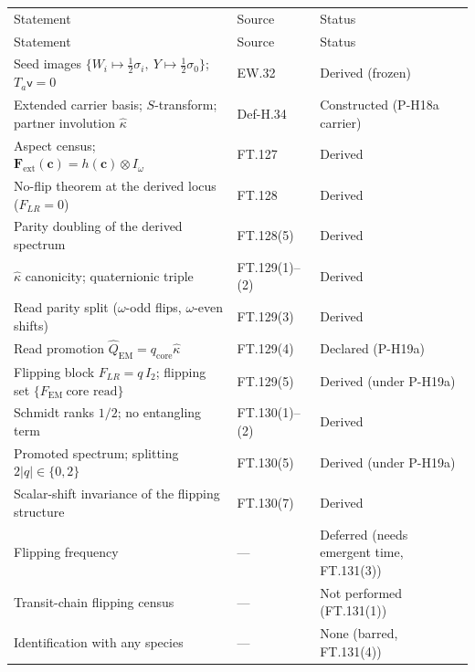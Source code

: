 \documentclass[11pt,openany]{report}
\theoremstyle{canonplain}
\theoremstyle{canondef}
\begin{document}
{\small\setlength{\tabcolsep}{4pt}
\begin{longtable}{>{\raggedright\arraybackslash}p{}|>{\raggedright\arraybackslash}p{}|>{\raggedright\arraybackslash}p{}}
\toprule
Statement & Source & Status \\
\addlinespace[2pt]
\midrule
\endfirsthead
\toprule
Statement & Source & Status \\
\addlinespace[2pt]
\midrule
\endhead
\bottomrule
\endlastfoot
Seed images $\{W_i\mapsto\tfrac12\sigma_i,\ Y\mapsto\tfrac12\sigma_0\}$; $T_a\mathsf v=\allowbreak 0$ & EW.32 & Derived (frozen) \\
Extended carrier basis; $S$-transform; partner involution $\hat\kappa$ & Def-H.34 & Constructed (P-H18a carrier) \\
Aspect census; $\mathbf F_{\mathrm{ext}}(\mathbf c)=\allowbreak h(\mathbf c)\otimes I_\omega$ & FT.127 & Derived \\
No-flip theorem at the derived locus ($F_{LR}=\allowbreak 0$) & FT.128 & Derived \\
Parity doubling of the derived spectrum & FT.128(5) & Derived \\
$\hat\kappa$ canonicity; quaternionic triple & FT.129(1)–(2) & Derived \\
Read parity split ($\omega$-odd flips, $\omega$-even shifts) & FT.129(3) & Derived \\
Read promotion $\hat Q_{\mathrm{EM}}=\allowbreak q_{\mathrm{core}}\hat\kappa$ & FT.129(4) & Declared (P-H19a) \\
Flipping block $F_{LR}=\allowbreak q\,\allowbreak I_2$; flipping set $\{F_{\mathrm{EM}}\ \text{core read}\}$ & FT.129(5) & Derived (under P-H19a) \\
Schmidt ranks $1/2$; no entangling term & FT.130(1)–(2) & Derived \\
Promoted spectrum; splitting $2|q|\in\allowbreak \{0,2\}$ & FT.130(5) & Derived (under P-H19a) \\
Scalar-shift invariance of the flipping structure & FT.130(7) & Derived \\
Flipping frequency & — & Deferred (needs emergent time, FT.131(3)) \\
Transit-chain flipping census & — & Not performed (FT.131(1)) \\
Identification with any species & — & None (barred, FT.131(4)) \\
\end{longtable}
}
\end{document}
